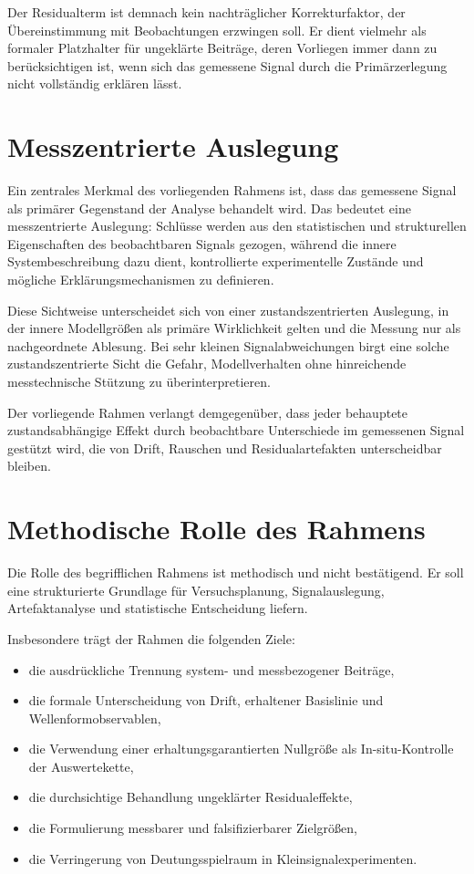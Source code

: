 \documentclass[12pt,a4paper]{report}
\begin{document}
Der Residualterm ist demnach kein nachträglicher Korrekturfaktor, der
Übereinstimmung mit Beobachtungen erzwingen soll. Er dient vielmehr als
formaler Platzhalter für ungeklärte Beiträge, deren Vorliegen immer dann
zu berücksichtigen ist, wenn sich das gemessene Signal durch die
Primärzerlegung nicht vollständig erklären lässt.

\section{Messzentrierte Auslegung}

Ein zentrales Merkmal des vorliegenden Rahmens ist, dass das gemessene
Signal als primärer Gegenstand der Analyse behandelt wird. Das bedeutet
eine messzentrierte Auslegung: Schlüsse werden aus den statistischen und
strukturellen Eigenschaften des beobachtbaren Signals gezogen, während
die innere Systembeschreibung dazu dient, kontrollierte experimentelle
Zustände und mögliche Erklärungsmechanismen zu definieren.

Diese Sichtweise unterscheidet sich von einer zustandszentrierten
Auslegung, in der innere Modellgrößen als primäre Wirklichkeit gelten und
die Messung nur als nachgeordnete Ablesung. Bei sehr kleinen
Signalabweichungen birgt eine solche zustandszentrierte Sicht die Gefahr,
Modellverhalten ohne hinreichende messtechnische Stützung zu
überinterpretieren.

Der vorliegende Rahmen verlangt demgegenüber, dass jeder behauptete
zustandsabhängige Effekt durch beobachtbare Unterschiede im gemessenen
Signal gestützt wird, die von Drift, Rauschen und Residualartefakten
unterscheidbar bleiben.

\section{Methodische Rolle des Rahmens}

Die Rolle des begrifflichen Rahmens ist methodisch und nicht
bestätigend. Er soll eine strukturierte Grundlage für Versuchsplanung,
Signalauslegung, Artefaktanalyse und statistische Entscheidung liefern.

Insbesondere trägt der Rahmen die folgenden Ziele:

\begin{itemize}
\item die ausdrückliche Trennung system- und messbezogener Beiträge,
\item die formale Unterscheidung von Drift, erhaltener Basislinie und
      Wellenformobservablen,
\item die Verwendung einer erhaltungsgarantierten Nullgröße als
      In-situ-Kontrolle der Auswertekette,
\item die durchsichtige Behandlung ungeklärter Residualeffekte,
\item die Formulierung messbarer und falsifizierbarer Zielgrößen,
\item die Verringerung von Deutungsspielraum in
      Kleinsignalexperimenten.
\end{itemize}
\end{document}
